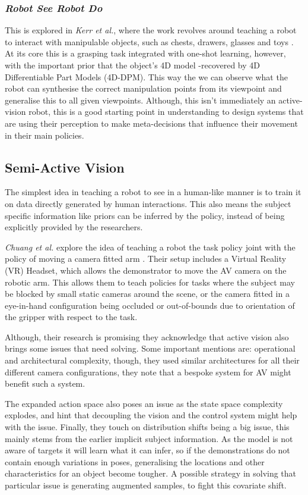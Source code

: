 \subsubsection{\emph{Robot See Robot Do}}
This is explored in \emph{Kerr et al.}, where the work revolves around teaching a robot to interact with manipulable objects, such as chests, drawers, glasses and toys \cite{kerr2024robotrobotdoimitating}. At its core this is a grasping task integrated with one-shot learning, however, with the important prior that the object's 4D model -recovered by 4D Differentiable Part Models (4D-DPM). This way the we can observe what the robot can synthesise the correct manipulation points from its viewpoint and generalise this to all given viewpoints. Although, this isn't immediately an active-vision robot, this is a good starting point in understanding to design systems that are using their perception to make meta-decisions that influence their movement in their main policies. 

\subsection{Semi-Active Vision}
The simplest idea in teaching a robot to see in a human-like manner is to train it on data directly generated by human interactions. This also means the subject specific information like priors can be inferred by the policy, instead of being explicitly provided by the researchers.

\emph{Chuang et al.} explore the idea of teaching a robot the task policy joint with the policy of moving a camera fitted arm \cite{chuang2024activevisionneedexploring}. Their setup includes a Virtual Reality (VR) Headset, which allows the demonstrator to move the AV camera on the robotic arm. This allows them to teach policies for tasks where the subject may be blocked by small static cameras around the scene, or the camera fitted in a eye-in-hand configuration being occluded or out-of-bounds due to orientation of the gripper with respect to the task. 

Although, their research is promising they acknowledge that active vision also brings some issues that need solving. Some important mentions are: operational and architectural complexity, though, they used similar architectures for all their different camera configurations, they note that a bespoke system for AV might benefit such a system. 

The expanded action space also poses an issue as the state space complexity explodes, and hint that decoupling the vision and the control system might help with the issue. Finally, they touch on distribution shifts being a big issue, this mainly stems from the earlier implicit subject information. As the model is not aware of targets it will learn what it can infer, so if the demonstrations do not contain enough variations in poses, generalising the  locations and other characteristics for an object become tougher. A possible strategy in solving that particular issue is generating augmented samples, to fight this covariate shift.


